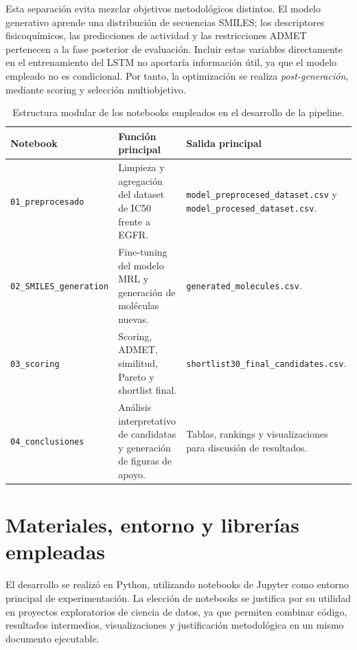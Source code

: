 \documentclass[IB]{TFUOC}%
\begin{document}
Esta separación evita mezclar objetivos metodológicos distintos. El modelo generativo aprende una distribución de secuencias SMILES; los descriptores fisicoquímicos, las predicciones de actividad y las restricciones ADMET pertenecen a la fase posterior de evaluación. Incluir estas variables directamente en el entrenamiento del LSTM no aportaría información útil, ya que el modelo empleado no es condicional. Por tanto, la optimización se realiza \textit{post-generación}, mediante scoring y selección multiobjetivo.

\begin{table}[H]
    \centering
    \small
    \begin{tabular}{p{4.2cm} p{5.1cm} p{4.7cm}}
        \hline
        \textbf{Notebook} & \textbf{Función principal} & \textbf{Salida principal} \\
        \hline
        \texttt{01\_preprocesado} & Limpieza y agregación del dataset de IC50 frente a EGFR. & \texttt{model\_preprocesed\_dataset.csv} y \texttt{model\_procesed\_dataset.csv}. \\
        \hline
        \texttt{02\_SMILES\_generation} & Fine-tuning del modelo MRL y generación de moléculas nuevas. & \texttt{generated\_molecules.csv}. \\
        \hline
        \texttt{03\_scoring} & Scoring, ADMET, similitud, Pareto y shortlist final. & \texttt{shortlist30\_final\_candidates.csv}. \\
        \hline
        \texttt{04\_conclusiones} & Análisis interpretativo de candidatas y generación de figuras de apoyo. & Tablas, rankings y visualizaciones para discusión de resultados. \\
        \hline
    \end{tabular}
    \caption{Estructura modular de los notebooks empleados en el desarrollo de la pipeline.}
    \label{tab:notebooks_pipeline}
\end{table}

\section{Materiales, entorno y librerías empleadas}

El desarrollo se realizó en Python, utilizando notebooks de Jupyter como entorno principal de experimentación. La elección de notebooks se justifica por su utilidad en proyectos exploratorios de ciencia de datos, ya que permiten combinar código, resultados intermedios, visualizaciones y justificación metodológica en un mismo documento ejecutable.
\end{document}
